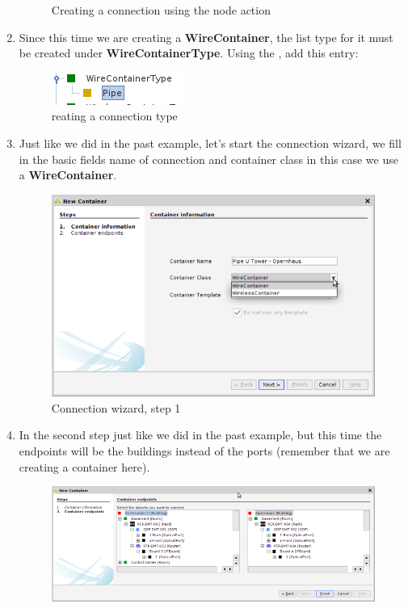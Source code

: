 \documentclass[a4paper]{article}
\begin{document}
\begin{enumerate}
\begin{figure}[h!]
						\caption{Creating a connection using the node action}
						\label{fig:actions_create_connection_container}
					\end{figure}
					\newpage
					\item Since this time we are creating a \textbf{WireContainer}, the list type for it must be created under \textbf{WireContainerType}. Using the , add this entry:
					\begin{figure}[h!]
						\centering
						\includegraphics[width=0.2\linewidth]{img/l1_example_1_wire_container_type.png}
						\caption{reating a connection type}
						\label{fig:l1_example_1_wire_container_type}
					\end{figure}
					\item Just like we did in the past example, let's start the connection wizard, we fill in the basic fields name of connection and container class in this case we use a \textbf{WireContainer}.
					\begin{figure}[h!]
						\centering
						\includegraphics[width=0.8\linewidth]{img/object_view_wizard_1.png}
						\caption{Connection wizard, step 1}
						\label{fig:l1_example_2_wizard_1}
					\end{figure}			
					\item In the second step just like we did in the past example, but this time the endpoints will be the buildings instead of the ports (remember that we are creating a container here).
					\begin{figure}[h!]
						\centering
						\includegraphics[width=0.8\linewidth]{img/l1_example_2_endpoints.png}

\end{figure}
\end{enumerate}
\end{document}
